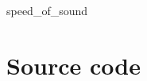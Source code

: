 \documentclass[11pt,titlepage]{report}
\begin{document}
\begin{appendices}
\renewcommand{\chapternumber}{\appendixname\space\thechapter} 

{speed_of_sound}

\chapter{Source code}
\label{app:sourcecode}

\end{appendices}
\end{document}
